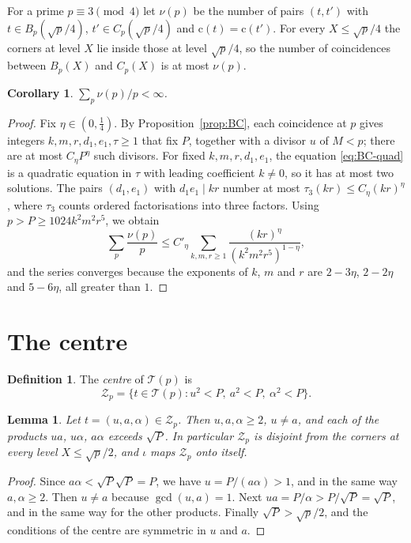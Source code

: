 \documentclass[aps,prd,twocolumn,superscriptaddress,nofootinbib,longbibliography,floatfix,showkeys,nobalancelastpage,amsmath,amssymb,10pt]{revtex4-2}
\theoremstyle{plain}
\newtheorem{lemma}[theorem]{Lemma}
\newtheorem{corollary}[theorem]{Corollary}
\theoremstyle{definition}
\newtheorem{definition}[theorem]{Definition}
\theoremstyle{plain}
\newcommand{\Tp}{\mathcal{T}}
\newcommand{\Zc}{\mathcal{Z}}
\newcommand{\cl}{\mathrm{c}}
\begin{document}
For a prime $p\equiv3\pmod4$ let $\nu(p)$ be the number of pairs $(t,t')$ with $t\in B_p(\sqrt p/4)$, $t'\in C_p(\sqrt p/4)$ and $\cl(t)=\cl(t')$. For every $X\le\sqrt p/4$ the corners at level $X$ lie inside those at level $\sqrt p/4$, so the number of coincidences between $B_p(X)$ and $C_p(X)$ is at most $\nu(p)$.

\begin{corollary}\label{cor:nu}
$\sum_p\nu(p)/p<\infty$.
\end{corollary}

\begin{proof}
Fix $\eta\in(0,\frac14)$. By Proposition~\ref{prop:BC}, each coincidence at $p$ gives integers $k,m,r,d_1,e_1,\tau\ge1$ that fix $P$, together with a divisor $u$ of $M<p$; there are at most $C_\eta P^\eta$ such divisors. For fixed $k,m,r,d_1,e_1$, the equation \eqref{eq:BC-quad} is a quadratic equation in $\tau$ with leading coefficient $k\ne0$, so it has at most two solutions. The pairs $(d_1,e_1)$ with $d_1e_1\mid kr$ number at most $\tau_3(kr)\le C_\eta(kr)^\eta$, where $\tau_3$ counts ordered factorisations into three factors. Using $p>P\ge1024k^2m^2r^5$, we obtain
\[
\sum_p\frac{\nu(p)}{p}\le C'_\eta\sum_{k,m,r\ge1}\frac{(kr)^\eta}{(k^2m^2r^5)^{1-\eta}},
\]
and the series converges because the exponents of $k$, $m$ and $r$ are $2-3\eta$, $2-2\eta$ and $5-6\eta$, all greater than $1$.
\end{proof}

\section{The centre}\label{sec:centre}

\begin{definition}\label{def:centre}
The \emph{centre} of $\Tp(p)$ is
\[
\Zc_p=\{t\in\Tp(p):u^2<P,\ a^2<P,\ \alpha^2<P\}.
\]
\end{definition}

\begin{lemma}\label{lem:centre}
Let $t=(u,a,\alpha)\in\Zc_p$. Then $u,a,\alpha\ge2$, $u\ne a$, and each of the products $ua$, $u\alpha$, $a\alpha$ exceeds $\sqrt P$. In particular $\Zc_p$ is disjoint from the corners at every level $X\le\sqrt p/2$, and $\iota$ maps $\Zc_p$ onto itself.
\end{lemma}

\begin{proof}
Since $a\alpha<\sqrt P\sqrt P=P$, we have $u=P/(a\alpha)>1$, and in the same way $a,\alpha\ge2$. Then $u\ne a$ because $\gcd(u,a)=1$. Next $ua=P/\alpha>P/\sqrt P=\sqrt P$, and in the same way for the other products. Finally $\sqrt P>\sqrt p/2$, and the conditions of the centre are symmetric in $u$ and $a$.
\end{proof}
\end{document}
